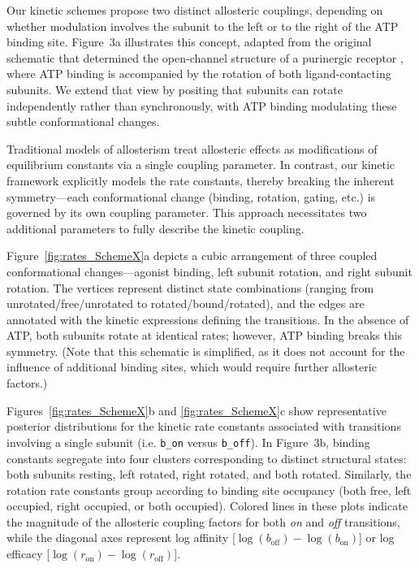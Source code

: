 \documentclass[pdflatex,sn-nature]{sn-jnl}%
\theoremstyle{thmstyleone}%
\theoremstyle{thmstyletwo}%
\theoremstyle{thmstylethree}%
\begin{document}
Our kinetic schemes propose two distinct allosteric couplings, depending on whether modulation involves the subunit to the left or to the right of the ATP binding site. Figure~3a illustrates this concept, adapted from the original schematic that determined the open-channel structure of a purinergic receptor \cite{abierta_p2x}, where ATP binding is accompanied by the rotation of both ligand-contacting subunits. We extend that view by positing that subunits can rotate independently rather than synchronously, with ATP binding modulating these subtle conformational changes.

Traditional models of allosterism treat allosteric effects as modifications of equilibrium constants via a single coupling parameter. In contrast, our kinetic framework explicitly models the rate constants, thereby breaking the inherent symmetry—each conformational change (binding, rotation, gating, etc.) is governed by its own coupling parameter. This approach necessitates two additional parameters to fully describe the kinetic coupling.

Figure~\ref{fig:rates_SchemeX}a depicts a cubic arrangement of three coupled conformational changes—agonist binding, left subunit rotation, and right subunit rotation. The vertices represent distinct state combinations (ranging from unrotated/free/unrotated to rotated/bound/rotated), and the edges are annotated with the kinetic expressions defining the transitions. In the absence of ATP, both subunits rotate at identical rates; however, ATP binding breaks this symmetry. (Note that this schematic is simplified, as it does not account for the influence of additional binding sites, which would require further allosteric factors.)

Figures~\ref{fig:rates_SchemeX}b and \ref{fig:rates_SchemeX}c show representative posterior distributions for the kinetic rate constants associated with transitions involving a single subunit (i.e. \texttt{b\_on} versus \texttt{b\_off}). In Figure~3b, binding constants segregate into four clusters corresponding to distinct structural states: both subunits resting, left rotated, right rotated, and both rotated. Similarly, the rotation rate constants group according to binding site occupancy (both free, left occupied, right occupied, or both occupied). Colored lines in these plots indicate the magnitude of the allosteric coupling factors for both \textit{on} and \textit{off} transitions, while the diagonal axes represent log affinity [$\log(b_{\text{off}})-\log(b_{\text{on}})$] or log efficacy [$\log(r_{\text{on}})-\log(r_{\text{off}})$].
\end{document}
